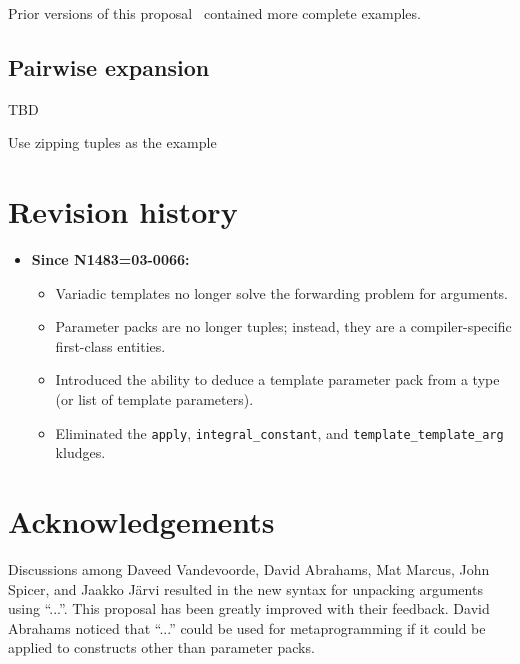 \documentclass{article}
\begin{document}
Prior versions of this proposal~\cite{GJP04a} contained more complete
examples.

\subsection{Pairwise expansion}
TBD

Use zipping tuples as the example

\section{Revision history}
\begin{itemize}
\item \textbf{Since N1483=03-0066:} 
  \begin{itemize}
  \item Variadic templates no longer solve the forwarding problem for
    arguments. 
  \item Parameter packs are no longer tuples; instead, they are a
    compiler-specific first-class entities.
  \item Introduced the ability to deduce a template parameter pack
    from a type (or list of template parameters).
  \item Eliminated the \texttt{apply}, \texttt{integral\_constant},
    and \texttt{template\_template\_arg} kludges.
  \end{itemize}
\end{itemize}

\section{Acknowledgements}
Discussions among Daveed Vandevoorde, David Abrahams, Mat Marcus, John
Spicer, and Jaakko J\"arvi resulted in the new syntax for unpacking
arguments using ``...''. This proposal has been greatly improved with
their feedback. David Abrahams noticed that ``...''  could be used for
metaprogramming if it could be applied to constructs other than
parameter packs.



\end{document}
